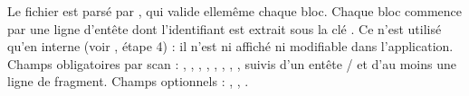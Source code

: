 \documentclass[letterpaper,10pt,english]{sphinxmanual}
\begin{document}
\sphinxAtStartPar
Le fichier est parsé par , qui valide
elle\sphinxhyphen{}même chaque bloc. Chaque bloc commence par une ligne d’en\sphinxhyphen{}tête
 dont l’identifiant est extrait sous la clé
. Ce  n’est utilisé qu’en interne (voir
{\hyperref[\detokenize{1_Integration:workflow}]{}}, étape 4) : il n’est ni affiché ni modifiable dans l’application.
Champs obligatoires par scan : ,
, , , ,
, , , suivis d’un en\sphinxhyphen{}tête
 /  et d’au moins une ligne de fragment. Champs optionnels :
, , .
\end{document}

